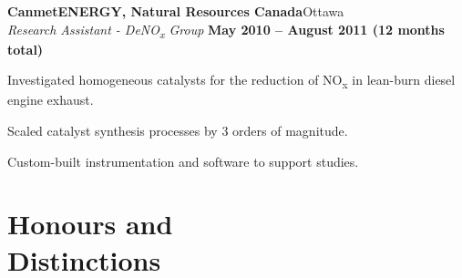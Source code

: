 \documentclass[margin,line]{resumecls}
\begin{document}
\begin{resume}
    \textbf{CanmetENERGY, Natural Resources Canada}\hfill Ottawa \\\vspace{1mm}%
    \textsl{Research Assistant - DeNO\textsubscript{x} Group} \hfill \textbf{May 2010 -- August 2011 (12 months total)}\\\vspace{-5mm}%
    \begin{list2}
        \item Investigated homogeneous catalysts for the reduction of NO\textsubscript{x} in lean-burn diesel engine exhaust.
        \item Scaled catalyst synthesis processes by 3 orders of magnitude.
        \item Custom-built instrumentation and software to support studies.
    \end{list2}

%

\newpage
    \section{\mysidestyle Honours and\\Distinctions}


\end{resume}
\end{document}
